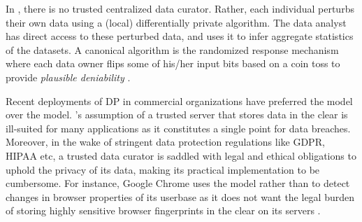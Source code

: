 
In \ldp, there is no trusted centralized data curator. Rather, each individual perturbs their own data using a (local) differentially private algorithm. The data analyst has direct access to these perturbed data, and uses it to infer aggregate statistics of the datasets. A canonical \ldp algorithm is the randomized response mechanism \cite{RR} where each data owner flips some of his/her input bits based on a coin toss to provide \emph{plausible deniability} \cite{Dork}.


Recent deployments of DP in commercial organizations \cite{Rappor1, Apple} have preferred the \ldp model over the \cdp model. \cdp's assumption of a trusted server that stores data in the clear is ill-suited for many applications as it constitutes a single point for data breaches. Moreover, in the wake of stringent data protection regulations like \textsf{GDPR}, \textsf{HIPAA} etc, a trusted data curator is saddled with legal and ethical obligations to uphold the privacy of its data, making its practical implementation to be cumbersome. For instance, Google Chrome uses the \ldp model rather than \cdp to detect changes in browser properties of its userbase as it does not want the legal burden of storing highly sensitive browser fingerprints in the clear on its servers \cite{Rappor1}. 
  

